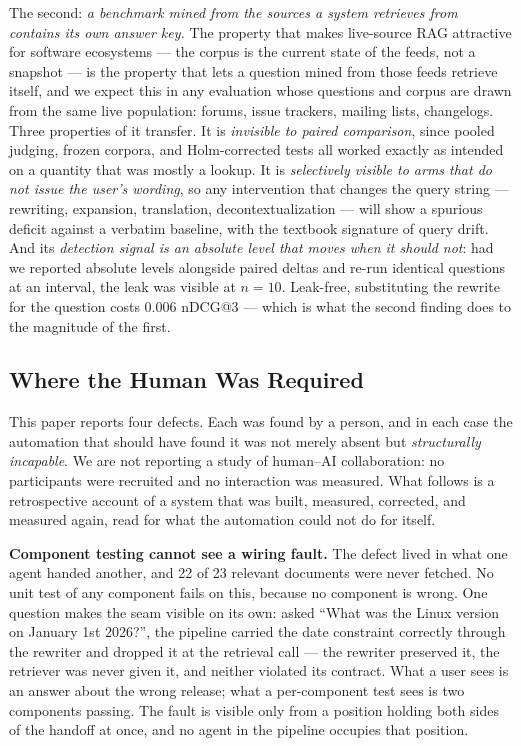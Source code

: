\documentclass[10pt,conference]{IEEEtran}
\begin{document}
The second: \emph{a benchmark mined from the sources a system retrieves from
contains its own answer key.} The property that makes live-source RAG attractive
for software ecosystems --- the corpus is the current state of the feeds, not a
snapshot --- is the property that lets a question mined from those feeds retrieve
itself, and we expect this in any evaluation whose questions and corpus are drawn
from the same live population: forums, issue trackers, mailing lists, changelogs.
Three properties of it transfer. It is \emph{invisible to paired comparison},
since pooled judging, frozen corpora, and Holm-corrected tests all worked exactly
as intended on a quantity that was mostly a lookup. It is \emph{selectively
visible to arms that do not issue the user's wording}, so any intervention that
changes the query string --- rewriting, expansion, translation,
decontextualization --- will show a spurious deficit against a verbatim baseline,
with the textbook signature of query drift. And its \emph{detection signal is an
absolute level that moves when it should not}: had we reported absolute levels
alongside paired deltas and re-run identical questions at an interval, the leak was
visible at $n=10$. Leak-free, substituting the rewrite for the question costs 0.006
nDCG@3 --- which is what the second finding does to the magnitude of the first.

\subsection{Where the Human Was Required}\label{sec:human}

This paper reports four defects. Each was found by a person, and in each case the
automation that should have found it was not merely absent but \emph{structurally
incapable}. We are not reporting a study of human--AI collaboration: no
participants were recruited and no interaction was measured. What follows is a
retrospective account of a system that was built, measured, corrected, and
measured again, read for what the automation could not do for itself.

\textbf{Component testing cannot see a wiring fault.} The defect lived in what
one agent handed another, and 22 of 23 relevant documents were never fetched. No
unit test of any component fails on this, because no component is wrong. One
question makes the seam visible on its own: asked ``What was the Linux version on
January 1st 2026?'', the pipeline carried the date constraint correctly through
the rewriter and dropped it at the retrieval call --- the rewriter preserved it,
the retriever was never given it, and neither violated its contract. What a user
sees is an answer about the wrong release; what a per-component test sees is two
components passing. The fault is visible only from a position holding both sides
of the handoff at once, and no agent in the pipeline occupies that position.
\end{document}
